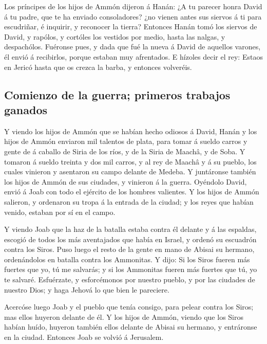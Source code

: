  Los príncipes de los hijos de Ammón dijeron á Hanán: ¿A
tu parecer honra David á tu padre, que te ha enviado consoladores? ¿no
vienen antes sus siervos á ti para escudriñar, é inquirir, y reconocer
la tierra?  Entonces Hanán tomó los siervos de David, y
rapólos, y cortóles los vestidos por medio, hasta las nalgas, y
despachólos.  Fuéronse pues, y dada que fué la nueva á
David de aquellos varones, él envió á recibirlos, porque estaban muy
afrentados. E hízoles decir el rey: Estaos en Jericó hasta que os crezca
la barba, y entonces volveréis.

\hypertarget{comienzo-de-la-guerra-primeros-trabajos-ganados}{%
\subsection{Comienzo de la guerra; primeros trabajos
ganados}\label{comienzo-de-la-guerra-primeros-trabajos-ganados}}

 Y viendo los hijos de Ammón que se habían hecho odiosos á
David, Hanán y los hijos de Ammón enviaron mil talentos de plata, para
tomar á sueldo carros y gente de á caballo de Siria de los ríos, y de la
Siria de Maachâ, y de Soba.  Y tomaron á sueldo treinta y
dos mil carros, y al rey de Maachâ y á su pueblo, los cuales vinieron y
asentaron su campo delante de Medeba. Y juntáronse también los hijos de
Ammón de sus ciudades, y vinieron á la guerra.  Oyéndolo
David, envió á Joab con todo el ejército de los hombres valientes.
 Y los hijos de Ammón salieron, y ordenaron su tropa á la
entrada de la ciudad; y los reyes que habían venido, estaban por sí en
el campo.

 Y viendo Joab que la haz de la batalla estaba contra él
delante y á las espaldas, escogió de todos los más aventajados que había
en Israel, y ordenó su escuadrón contra los Siros.  Puso
luego el resto de la gente en mano de Abisai su hermano, ordenándolos en
batalla contra los Ammonitas.  Y dijo: Si los Siros
fueren más fuertes que yo, tú me salvarás; y si los Ammonitas fueren más
fuertes que tú, yo te salvaré.  Esfuérzate, y
esforcémonos por nuestro pueblo, y por las ciudades de nuestro Dios; y
haga Jehová lo que bien le pareciere.

 Acercóse luego Joab y el pueblo que tenía consigo, para
pelear contra los Siros; mas ellos huyeron delante de él.
 Y los hijos de Ammón, viendo que los Siros habían huído,
huyeron también ellos delante de Abisai su hermano, y entráronse en la
ciudad. Entonces Joab se volvió á Jerusalem.


